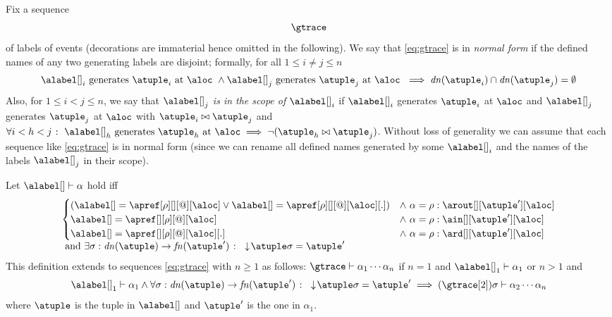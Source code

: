 Fix a sequence
\begin{align}
  \label{eq:gtrace}
  \gtrace  
\end{align}
of labels of events (decorations are immaterial hence omitted in the
following).
%
We say that \eqref{eq:gtrace} is in \emph{normal form} if the defined
names of any two generating labels are disjoint; formally, for all
$1 \leq i \neq j \leq n$
%
\[
  \alabel[]_i \text{ generates
  $\atuple_i$ at $\aloc$ } \land \alabel[]_j \text{ generates
  $\atuple_j$ at $\aloc$ } \implies \dn{\atuple_i} \cap \dn{\atuple_j}
= \emptyset
\]
%
Also, for $1 \leq i < j \leq n$, we say that $\alabel[]_j$ \emph{is in
  the scope of $\alabel[]_i$} if $\alabel[]_i$ generates $\atuple_i$
at $\aloc$ and $\alabel[]_j$ generates $\atuple_j$ at $\aloc$ with
$\atuple_i \matches \atuple_j$ and
$\forall i < h < j \qst \alabel[]_h \text{ generates } \atuple_h
\text{ at } \aloc \implies \neg(\atuple_h \matches \atuple_j)$.
%
Without loss of generality we can assume that each sequence like
\eqref{eq:gtrace} is in normal form (since we can rename all defined
names generated by some $\alabel[]_i$ and the names of the labels
$\alabel[]_j$ in their scope).

Let $\alabel[] \vdash \alpha$ hold iff
\[\begin{array}{l}
  \begin{cases}
    (\alabel[] = \apref[\arole][][@][\aloc] \vee \alabel[] = \apref[\arole][][@][\aloc][.]) & \land\ \alpha = \arole : \arout[][\atuple'][\aloc]
    \\
    \alabel[] = \apref[][\arole][@][\aloc] & \land\ \alpha = \arole : \ain[][\atuple'][\aloc]
    \\
    \alabel[] = \apref[][\arole][@][\aloc][.] & \land\ \alpha = \arole : \ard[][\atuple'][\aloc]
  \end{cases}
    \\
  \text{ and }
  \exists \sigma: \dn{\atuple} \to \fn{\atuple'} \qst \eraseB{\atuple}\sigma = \atuple'
  \end{array}
\]
This definition extends to sequences \eqref{eq:gtrace} with $n \geq 1$
as follows:
$\gtrace \vdash \alpha_1 \cdots \alpha_n$ if
$n = 1$  and $\alabel[]_1 \vdash \alpha_1$ or
$n > 1$ and
\[
  \alabel[]_1 \vdash \alpha_1 \land  \forall \sigma: \dn{\atuple} \to \fn{\atuple'} \qst \eraseB{\atuple}\sigma = \atuple'
  \implies (\gtrace[2])\sigma \vdash \alpha_2 \cdots \alpha_n
\]
where $\atuple$ is the tuple in $\alabel[]$ and $\atuple'$ is the one in $\alpha_1$.


